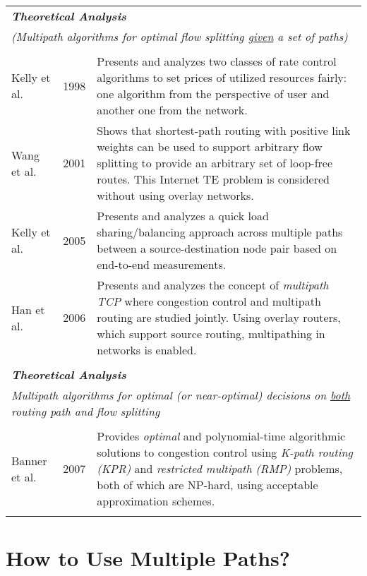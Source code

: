 \documentclass[10pt]{IEEEtran}
\begin{document}
\begin{table*}[!ht]
\begin{tabular}{p{2.7cm}p{1cm}p{13cm}}
\\
\multicolumn{3}{l}{\textit{\textbf{Theoretical Analysis}}}\\
\multicolumn{3}{l}{\textit{(Multipath algorithms for optimal flow splitting \underline{given} a set of paths)}}\\

\\
Kelly et al. \cite{kelly1998rate} & 1998 & Presents and analyzes two classes of rate control algorithms to set prices of utilized resources fairly: one algorithm from the perspective of user and another one from the network. \\
Wang et al. \cite{wang2001internet} & 2001 & Shows that shortest-path routing with positive link weights can be used to support arbitrary flow splitting to provide an arbitrary set of loop-free routes. This Internet TE problem is considered without using overlay networks. \\
Kelly et al. \cite{kelly2005stability} & 2005 & Presents and analyzes a quick load sharing/balancing approach across multiple paths between a source-destination node pair based on end-to-end measurements.\\
Han et al. \cite{han2006multi} & 2006 & Presents and analyzes the concept of \textit{multipath TCP} where congestion control and multipath routing are studied jointly. Using overlay routers, which support source routing, multipathing in networks is enabled. \\

\\
\multicolumn{3}{l}{\textit{\textbf{Theoretical Analysis}}}\\
\multicolumn{3}{l}{\textit{Multipath algorithms for optimal (or near-optimal) decisions on \underline{both} routing path and flow splitting}}.\\
\\

Banner et al. \cite{banner2007multipath} & 2007 & Provides \textit{optimal} and polynomial-time algorithmic solutions to congestion control using \textit{K-path routing (KPR)} and \textit{restricted multipath (RMP)} problems, both of which are NP-hard, using acceptable approximation schemes.\\

\\
\hline
\end{tabular}
\end{table*}

\vspace{2mm}
\section{How to Use Multiple Paths?}
\label{sec:usage_mp}
\end{document}

